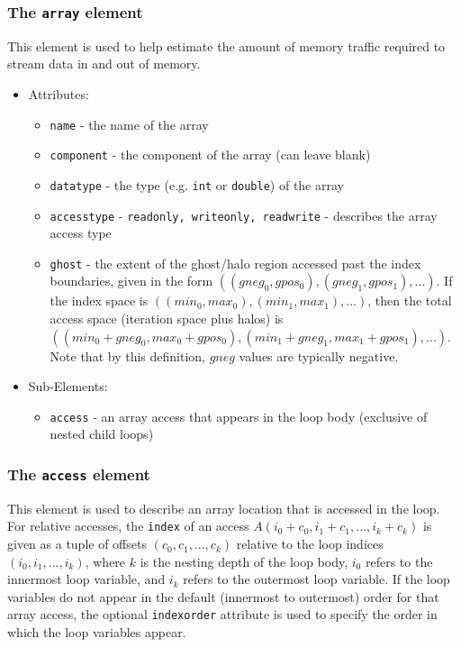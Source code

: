 \documentclass{article}
\begin{document}
\subsubsection{The {\tt array} element}
\label{sec:loopArrayElement}
  This element is used to help estimate the amount of memory traffic
  required to stream data in and out of memory.
  \begin{itemize}
    \item Attributes:
    \begin{itemize}
      \item {\tt name} - the name of the array
      \item {\tt component} - the component of the array (can leave blank)
      \item {\tt datatype} - the type (e.g. {\tt int} or {\tt double})
        of the array
      \item {\tt accesstype} - {\tt readonly, writeonly, readwrite} -
        describes the array access type
      \item {\tt ghost} - the extent of the ghost/halo region accessed
        past the index boundaries, given in the form $((gneg_0, gpos_0),
        (gneg_1, gpos_1), ...)$.  If the index space is $((min_0, max_0),
        (min_1, max_1), ...)$, then the total access space (iteration
        space plus halos) is $((min_0 + gneg_0, max_0 + gpos_0), (min_1 +
        gneg_1, max_1 + gpos_1), ...)$.  Note that by this definition,
        $gneg$ values are typically negative.
    \end{itemize} \item Sub-Elements: \begin{itemize}
      \item {\tt access} - an array access that appears in the loop body
        (exclusive of nested child loops)
    \end{itemize}
  \end{itemize}

\subsubsection{The {\tt access} element}
\label{sec:accessElement}
  This element is used to describe an array location that is accessed in
  the loop.  For relative accesses, the {\tt index} of an access $A(i_0
  + c_0, i_1 + c_1, ..., i_k + c_k)$ is given as a tuple of offsets
  $(c_0, c_1, ..., c_k)$ relative to the loop indices $(i_0, i_1, ...,
  i_k)$, where $k$ is the nesting depth of the loop body, $i_0$ refers
  to the innermost loop variable, and $i_k$ refers to the outermost
  loop variable.  If the loop variables do not appear in the default
  (innermost to outermost) order for that array access, the optional
  {\tt indexorder} attribute is used to specify the order in which the
  loop variables appear.
\end{document}
